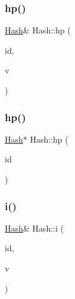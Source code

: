 \mbox{\label{classHash_ae846c2193a26ac79cad5113357521132}} 
\subsubsection{\texorpdfstring{hp()}{hp()}\hspace{0.1cm}{\footnotesize\ttfamily [1/2]}}
{\footnotesize\ttfamily \mbox{\hyperlink{classHash}{Hash}}\& Hash\+::hp (\begin{DoxyParamCaption}\item[{int}]{id,  }\item[{\mbox{\hyperlink{classHash}{Hash}} $\ast$}]{v }\end{DoxyParamCaption})}

\mbox{\label{classHash_abb7606f3a1a958bd23a4485ac66130b0}} 
\subsubsection{\texorpdfstring{hp()}{hp()}\hspace{0.1cm}{\footnotesize\ttfamily [2/2]}}
{\footnotesize\ttfamily \mbox{\hyperlink{classHash}{Hash}}$\ast$ Hash\+::hp (\begin{DoxyParamCaption}\item[{int}]{id }\end{DoxyParamCaption})}

\mbox{\label{classHash_a57bf0acaae601c62c08bbe86442045ef}} 
\subsubsection{\texorpdfstring{i()}{i()}\hspace{0.1cm}{\footnotesize\ttfamily [1/2]}}
{\footnotesize\ttfamily \mbox{\hyperlink{classHash}{Hash}}\& Hash\+::i (\begin{DoxyParamCaption}\item[{int}]{id,  }\item[{\mbox{\hyperlink{Node_8h_a17693eab3c96e5b590641f884a5a6ff1}{n\+Int}}}]{v }\end{DoxyParamCaption})}

\mbox{\label{classHash_af608cf780ab2cc8208eb0c1c5aa24a4a}} 
